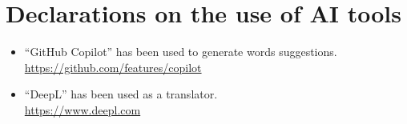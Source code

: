 \documentclass{article}
\begin{document}
\vfill
\section*{Declarations on the use of AI tools}
\begin{itemize}
    \item ``GitHub Copilot'' has been used to generate words suggestions.\\
        \url{https://github.com/features/copilot}
    \item ``DeepL'' has been used as a translator.\\
        \url{https://www.deepl.com}
\end{itemize}

\setlength{\bibitemsep}{1.2\baselineskip}
\printbibliography[title={References}]
\end{document}
